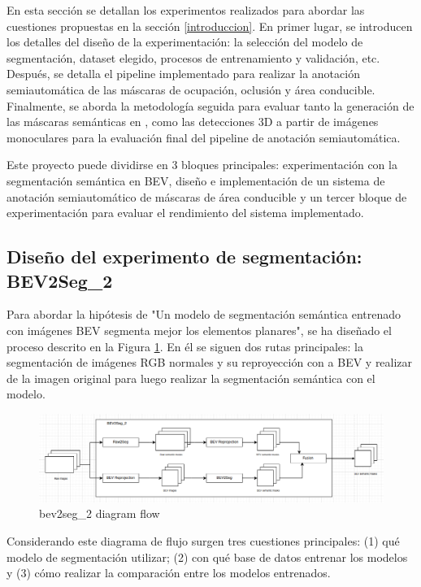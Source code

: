 
En esta sección se detallan los experimentos realizados para abordar las cuestiones propuestas en la sección \ref{introduccion}. En primer lugar, se introducen los detalles del diseño de la experimentación: la selección del modelo de segmentación, dataset elegido, procesos de entrenamiento y validación, etc. Después, se detalla el pipeline implementado para realizar la anotación semiautomática de las máscaras de ocupación, oclusión y área conducible. Finalmente, se aborda la metodología seguida para evaluar tanto la generación de las máscaras semánticas en , como las detecciones 3D a partir de imágenes monoculares para la evaluación final del pipeline de anotación semiautomática.

Este proyecto puede dividirse en 3 bloques principales: experimentación con la segmentación semántica en BEV, diseño e implementación de un sistema de anotación semiautomático de máscaras de área conducible y un tercer bloque de experimentación para evaluar el rendimiento del sistema implementado.

\subsection{Diseño del experimento de segmentación: BEV2Seg\_2}
\label{bev2seg_2}

Para abordar la hipótesis de "Un modelo de segmentación semántica entrenado con imágenes BEV segmenta mejor los elementos planares", se ha diseñado el proceso descrito en la Figura \ref{fig:beg2seg_2_flow}. En él se siguen dos rutas principales: la segmentación de imágenes RGB normales y su reproyección con  a BEV y realizar  de la imagen original para luego realizar la segmentación semántica con el modelo.

\begin{figure}[h!]
    \centering
    \includegraphics[width=\linewidth]{./images/metodology/bev2seg_2_flow.png}
    \caption{bev2seg\_2 diagram flow}
    \label{fig:beg2seg_2_flow}
\end{figure}

Considerando este diagrama de flujo surgen tres cuestiones principales: (1) qué modelo de segmentación utilizar; (2) con qué base de datos entrenar los modelos y (3) cómo realizar la comparación entre los modelos entrenados.


